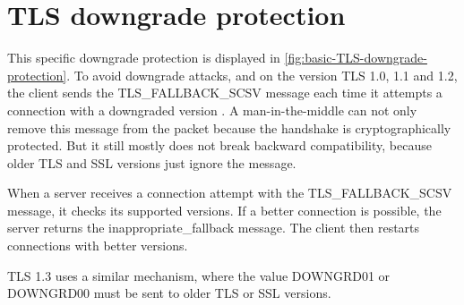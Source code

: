 \documentclass[journal=tches,final]{iacrtrans}
\begin{document}
\section{TLS downgrade protection}
\label{sec:TLS-downgrade-protection}

This specific downgrade protection is displayed in \autoref{fig:basic-TLS-downgrade-protection}. To avoid downgrade attacks, and on the version TLS 1.0, 1.1 and 1.2, the client sends the TLS\_FALLBACK\_SCSV message each time it attempts a connection with a downgraded version \cite{TLS-Fallback-Signaling-Cipher-Suite-Value}. A man-in-the-middle can not only remove this message from the packet because the handshake is cryptographically protected. But it still mostly does not break backward compatibility, because older TLS and SSL versions just ignore the message.

When a server receives a connection attempt with the TLS\_FALLBACK\_SCSV message, it checks its supported versions. If a better connection is possible, the server returns the inappropriate\_fallback message. The client then restarts connections with better versions. \cite{TLS-Fallback-Signaling-Cipher-Suite-Value}

TLS 1.3 uses a similar mechanism, where the value DOWNGRD01 or DOWNGRD00 must be sent to older TLS or SSL versions. \cite{TLS-1.3-in-Practice}




\end{document}
